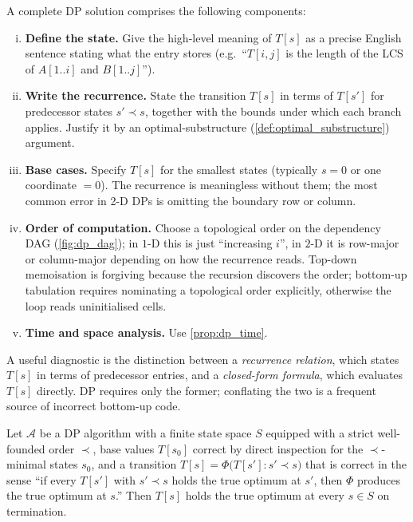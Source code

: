 A complete DP solution comprises the following components:
\begin{enumerate}[(i)]
  \item \textbf{Define the state.} Give the high-level meaning of $T[s]$ as a precise English sentence stating what the entry stores (e.g.\ ``$T[i, j]$ is the length of the LCS of $A[1..i]$ and $B[1..j]$'').
  \item \textbf{Write the recurrence.} State the transition $T[s]$ in terms of $T[s']$ for predecessor states $s' \prec s$, together with the bounds under which each branch applies. Justify it by an optimal-substructure (\cref{def:optimal_substructure}) argument.
  \item \textbf{Base cases.} Specify $T[s]$ for the smallest states (typically $s = 0$ or one coordinate $= 0$). The recurrence is meaningless without them; the most common error in 2-D DPs is omitting the boundary row or column.
  \item \textbf{Order of computation.} Choose a topological order on the dependency DAG (\cref{fig:dp_dag}); in $1$-D this is just ``increasing $i$'', in $2$-D it is row-major or column-major depending on how the recurrence reads. Top-down memoisation is forgiving because the recursion discovers the order; bottom-up tabulation requires nominating a topological order explicitly, otherwise the loop reads uninitialised cells.
  \item \textbf{Time and space analysis.} Use \cref{prop:dp_time}.
\end{enumerate}

A useful diagnostic is the distinction between a \emph{recurrence relation}, which states $T[s]$ in terms of predecessor entries, and a \emph{closed-form formula}, which evaluates $T[s]$ directly. DP requires only the former; conflating the two is a frequent source of incorrect bottom-up code.

\begin{theorem}
\label{thm:dp_correctness}
Let $\mathcal{A}$ be a DP algorithm with a finite state space $S$ equipped with a strict well-founded order $\prec$, base values $T[s_0]$ correct by direct inspection for the $\prec$-minimal states $s_0$, and a transition $T[s] = \Phi\bigl(T[s'] : s' \prec s\bigr)$ that is correct in the sense ``if every $T[s']$ with $s' \prec s$ holds the true optimum at $s'$, then $\Phi$ produces the true optimum at $s$.'' Then $T[s]$ holds the true optimum at every $s \in S$ on termination.
\end{theorem}

